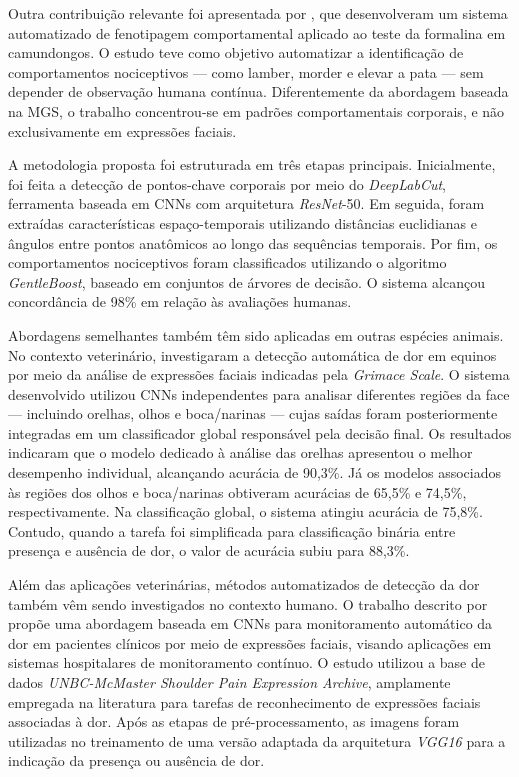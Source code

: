 Outra contribuição relevante foi apresentada por \cite{Wotton2020}, que desenvolveram um sistema automatizado de fenotipagem comportamental aplicado ao teste da formalina em camundongos. O estudo teve como objetivo automatizar a identificação de comportamentos nociceptivos — como lamber, morder e elevar a pata — sem depender de observação humana contínua. Diferentemente da abordagem baseada na \acs{MGS}, o trabalho concentrou-se em padrões comportamentais corporais, e não exclusivamente em expressões faciais.

A metodologia proposta foi estruturada em três etapas principais. Inicialmente, foi feita a detecção de pontos-chave corporais por meio do \textit{DeepLabCut}, ferramenta baseada em \acsp{CNN} com arquitetura \textit{ResNet}-50. Em seguida, foram extraídas características espaço-temporais utilizando distâncias euclidianas e ângulos entre pontos anatômicos ao longo das sequências temporais. Por fim, os comportamentos nociceptivos foram classificados utilizando o algoritmo \textit{GentleBoost}, baseado em conjuntos de árvores de decisão. O sistema alcançou concordância de 98\% em relação às avaliações humanas.

Abordagens semelhantes também têm sido aplicadas em outras espécies animais. No contexto veterinário, \cite{lencioni2021} investigaram a detecção automática de dor em equinos por meio da análise de expressões faciais indicadas pela \textit{Grimace Scale}. O sistema desenvolvido utilizou \acsp{CNN} independentes para analisar diferentes regiões da face — incluindo orelhas, olhos e boca/narinas — cujas saídas foram posteriormente integradas em um classificador global responsável pela decisão final. Os resultados indicaram que o modelo dedicado à análise das orelhas apresentou o melhor desempenho individual, alcançando acurácia de 90,3\%. Já os modelos associados às regiões dos olhos e boca/narinas obtiveram acurácias de 65,5\% e 74,5\%, respectivamente. Na classificação global, o sistema atingiu acurácia de 75,8\%. Contudo, quando a tarefa foi simplificada para classificação binária entre presença e ausência de dor, o valor de acurácia subiu para 88,3\%.

Além das aplicações veterinárias, métodos automatizados de detecção da dor também vêm sendo investigados no contexto humano. O trabalho descrito por \cite{karamitsos2021} propõe uma abordagem baseada em \acsp{CNN} para monitoramento automático da dor em pacientes clínicos por meio de expressões faciais, visando aplicações em sistemas hospitalares de monitoramento contínuo. O estudo utilizou a base de dados \textit{UNBC-McMaster Shoulder Pain Expression Archive}, amplamente empregada na literatura para tarefas de reconhecimento de expressões faciais associadas à dor. Após as etapas de pré-processamento, as imagens foram utilizadas no treinamento de uma versão adaptada da arquitetura \textit{\acs{VGG}16} para a indicação da presença ou ausência de dor.

